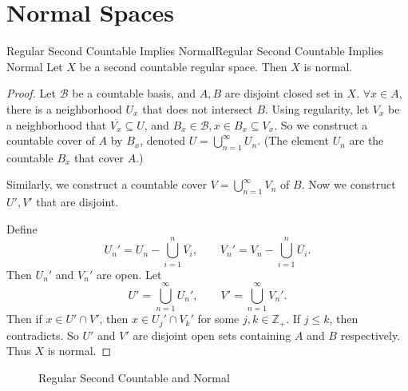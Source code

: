 \documentclass[../main.tex]{subfiles}
\begin{document}
\section{Normal Spaces}
\begin{theorem}{Regular Second Countable Implies Normal}{Regular Second Countable Implies Normal}
Let $X$ be a second countable regular space. Then $X$ is normal.
\end{theorem}

\begin{proof}
Let $\mathcal{B}$ be a countable basis, and $A,B$ are disjoint closed set in $X$. $\forall x\in A$, there is a neighborhood $U_x$ that does not intersect $B$. Using regularity, let $V_x$ be a neighborhood that $\overline{V_x} \subseteq U$, and $B_x\in \mathcal{B}, x\in B_x \subseteq V_x$. So we construct a countable cover of $A$ by $B_x$, denoted $U = \bigcup_{n=1}^{\infty } U_n$. (The element $U_n$ are the countable $B_x$ that cover $A$.)

Similarly, we construct a countable cover $V = \bigcup_{n=1}^{\infty } V_n$ of $B$. Now we construct $U',V'$ that are disjoint.

Define
\begin{equation*}
	U_n' = U_n - \bigcup_{i=1}^{n} \overline{V_i}, \qquad V_n' = V_n - \bigcup_{i=1}^{n} \overline{U_i}.
\end{equation*}
Then $U_n'$ and $V_n'$ are open. Let
\begin{equation*}
	U' = \bigcup_{n=1}^{\infty } U_n', \qquad V' = \bigcup_{n=1}^{\infty } V_n'.
\end{equation*}
Then if $x\in U'\cap V'$, then $x\in U_j'\cap V_k'$ for some $j,k\in \mathbb{Z}_+$. If $j\leq k$, then contradicts. So $U'$ and $V'$ are disjoint open sets containing $A$ and $B$ respectively. Thus $X$ is normal.
\end{proof}

\begin{figure}[ht]
    \centering
    \caption{Regular Second Countable and Normal}
    \label{fig:regular-second-countable-and-normal}
\end{figure}
\end{document}
